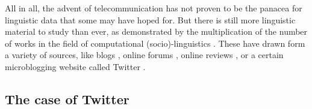 \documentclass[../thesis.tex]{subfiles}
\begin{document}
All in all, the advent of telecommunication has not proven to be the panacea for
linguistic data that some may have hoped for. But there is still more linguistic
material to study than ever, as demonstrated by the multiplication of the number of
works in the field of computational (socio)-linguistics
\cite{NguyenComputationalSociolinguistics2016}. These have drawn form a variety of
sources, like blogs \cite{NguyenAuthorAge2011,SchlerEffectsAge2006}, online forums
\cite{BaruaWhatAre2014,GarleyBeefmovesDissemination2012,NguyenAuthorAge2011}, online
reviews
\cite{HovyUserReview2015,Danescu-Niculescu-MizilNoCountry2013,OtterbacherInferringGender2010},
or a certain microblogging website called Twitter \cite{MocanuTwitterBabel2013,AlshaabiStorywranglerMassive2021,CodyClimateChange2015,ZamalHomophilyLatent2012,LiaoLifetimeLexical2014}.


\subsection{The case of Twitter}
\end{document}
